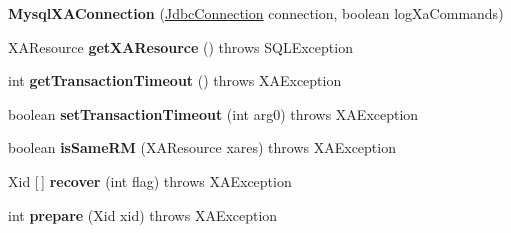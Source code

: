 \begin{DoxyCompactItemize}
\item 
\mbox{\label{classcom_1_1mysql_1_1cj_1_1jdbc_1_1_mysql_x_a_connection_ab6bc1b1d3cad547e542c44bdc591e581}} 
{\bfseries Mysql\+X\+A\+Connection} (\mbox{\hyperlink{interfacecom_1_1mysql_1_1cj_1_1jdbc_1_1_jdbc_connection}{Jdbc\+Connection}} connection, boolean log\+Xa\+Commands)
\item 
\mbox{\label{classcom_1_1mysql_1_1cj_1_1jdbc_1_1_mysql_x_a_connection_ae8f9497d327b131871bfefe4a8ae6c9d}} 
X\+A\+Resource {\bfseries get\+X\+A\+Resource} ()  throws S\+Q\+L\+Exception 
\item 
\mbox{\label{classcom_1_1mysql_1_1cj_1_1jdbc_1_1_mysql_x_a_connection_ae2dc2f285e5de1d56599f992ede4c71d}} 
int {\bfseries get\+Transaction\+Timeout} ()  throws X\+A\+Exception 
\item 
\mbox{\label{classcom_1_1mysql_1_1cj_1_1jdbc_1_1_mysql_x_a_connection_a248a14335113b2cf9289db82c977db9c}} 
boolean {\bfseries set\+Transaction\+Timeout} (int arg0)  throws X\+A\+Exception 
\item 
\mbox{\label{classcom_1_1mysql_1_1cj_1_1jdbc_1_1_mysql_x_a_connection_a6f7627c2098ba19cd1e9cd3162b7dbe6}} 
boolean {\bfseries is\+Same\+RM} (X\+A\+Resource xares)  throws X\+A\+Exception 
\item 
\mbox{\label{classcom_1_1mysql_1_1cj_1_1jdbc_1_1_mysql_x_a_connection_ae272df21634f0f4a88b12cae093e9831}} 
Xid \mbox{[}$\,$\mbox{]} {\bfseries recover} (int flag)  throws X\+A\+Exception 
\item 
\mbox{\label{classcom_1_1mysql_1_1cj_1_1jdbc_1_1_mysql_x_a_connection_a813bc9c4ead81e9da2835fa2d57246a1}} 
int {\bfseries prepare} (Xid xid)  throws X\+A\+Exception 
\item 
\mbox{\label{classcom_1_1mysql_1_1cj_1_1jdbc_1_1_mysql_x_a_connection_ab11b3a86e81d0c3ecc236c620939aabf}} 

\end{DoxyCompactItemize}
